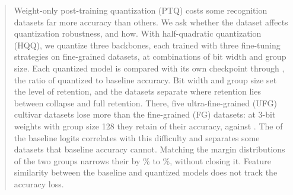 \begin{abstract}
Weight-only post-training quantization (PTQ) costs some recognition datasets far more accuracy than others.
We ask whether the dataset affects quantization robustness, and how.
With half-quadratic quantization (HQQ), we quantize three backbones, each trained with three fine-tuning strategies on  fine-grained datasets, at  combinations of bit width and group size.
Each quantized model is compared with its own checkpoint through , the ratio of quantized to baseline accuracy.
Bit width and group size set the level of retention, and the datasets separate where retention lies between collapse and full retention.
There, five ultra-fine-grained (UFG) cultivar datasets lose more than the  fine-grained (FG) datasets: at 3-bit weights with group size 128 they retain  of their accuracy, against .
The  of the baseline logits correlates with this difficulty and separates some datasets that baseline accuracy cannot.
Matching the margin distributions of the two groups narrows their  by \% to \%, without closing it.
Feature similarity between the baseline and quantized models does not track the accuracy loss.
\end{abstract}
